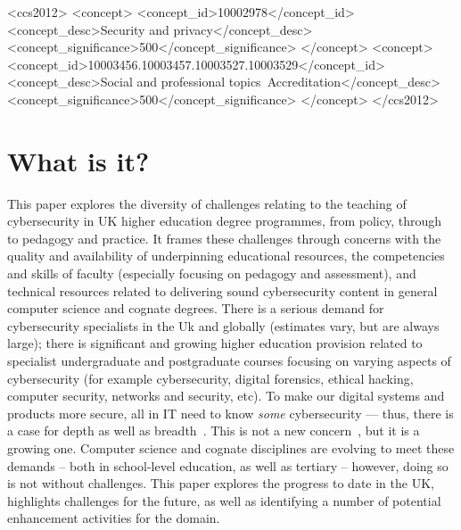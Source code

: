 \documentclass[sigconf]{acmart}
\begin{document}
\begin{CCSXML}
<ccs2012>
<concept>
<concept_id>10002978</concept_id>
<concept_desc>Security and privacy</concept_desc>
<concept_significance>500</concept_significance>
</concept>
<concept>
<concept_id>10003456.10003457.10003527.10003529</concept_id>
<concept_desc>Social and professional topics~Accreditation</concept_desc>
<concept_significance>500</concept_significance>
</concept>
</ccs2012>
\end{CCSXML}





\maketitle


\section {What is it?}

This paper explores the diversity of challenges relating to the
teaching of cybersecurity in UK higher education degree programmes,
from policy, through to pedagogy and practice. It frames these challenges through
concerns with the quality and availability of underpinning educational resources, the
competencies and skills of faculty (especially focusing on pedagogy
and assessment), and technical resources related to delivering sound
cybersecurity content in general computer science and cognate
degrees. There is a serious demand for cybersecurity specialists in the
Uk and globally (estimates vary, but are always large); there is
significant and growing higher education provision related to
specialist undergraduate and postgraduate courses focusing on varying
aspects of cybersecurity (for example cybersecurity, digital
forensics, ethical hacking, computer security, networks and security,
etc). To make our digital systems and products more secure, all in IT
need to know \emph{some} cybersecurity --- thus, there is a case for
depth as well as
breadth~\cite{manson+pike:2014,davenport-et-al:latice2016}. This is
not a new concern~\cite{Parr2014a}, but it is a growing one. Computer
science and cognate disciplines are evolving to meet these demands --
both in school-level education, as well as tertiary -- however,
doing so is not without challenges. This paper explores the progress
to date in the UK, highlights challenges for the future, as well as
identifying a number of potential enhancement activities for the domain.
\end{document}
